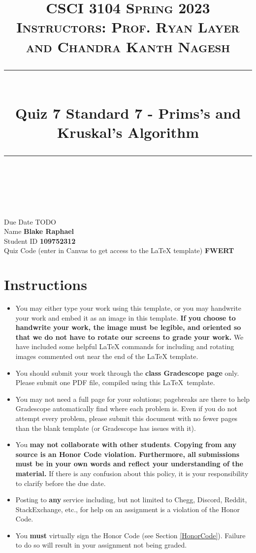 \documentclass[11pt]{article}
\title{
\normalfont \normalsize 
\textsc{CSCI 3104 Spring 2023 \\ 
Instructors: Prof. Ryan Layer and Chandra Kanth Nagesh} \\
[10pt] 
\rule{\linewidth}{0.5pt} \\[6pt] 
\huge Quiz 7 Standard 7 - Prims's and Kruskal's Algorithm \\
\rule{\linewidth}{2pt}  \\[10pt]
}
\date{}
\theoremstyle{definition}
\theoremstyle{definition}
\theoremstyle{definition}
\begin{document}

\maketitle


\noindent
Due Date \dotfill TODO \\
Name \dotfill \textbf{Blake Raphael} \\
Student ID \dotfill \textbf{109752312} \\
Quiz Code (enter in Canvas to get access to the LaTeX template) \dotfill \textbf{FWERT}


\tableofcontents

\section*{Instructions}
 \begin{itemize}
	\item You may either type your work using this template, or you may handwrite your work and embed it as an image in this template. \textbf{If you choose to handwrite your work, the image must be legible, and oriented so that we do not have to rotate our screens to grade your work.} We have included some helpful LaTeX commands for including and rotating images commented out near the end of the LaTeX template.
	\item You should submit your work through the \textbf{class Gradescope page} only. Please submit one PDF file, compiled using this \LaTeX \ template.
	\item You may not need a full page for your solutions; pagebreaks are there to help Gradescope automatically find where each problem is. Even if you do not attempt every problem, please submit this document with no fewer pages than the blank template (or Gradescope has issues with it).

	\item You \textbf{may not collaborate with other students}. \textbf{Copying from any source is an Honor Code violation. Furthermore, all submissions must be in your own words and reflect your understanding of the material.} If there is any confusion about this policy, it is your responsibility to clarify before the due date. 

	\item Posting to \textbf{any} service including, but not limited to Chegg, Discord, Reddit, StackExchange, etc., for help on an assignment is a violation of the Honor Code.

	\item You \textbf{must} virtually sign the Honor Code (see Section \ref{HonorCode}). Failure to do so will result in your assignment not being graded.
\end{itemize}
\end{document}
